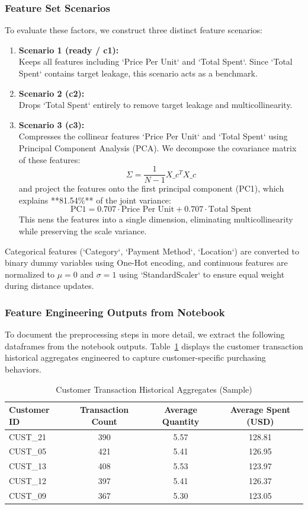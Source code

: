 \documentclass[12pt,a4paper]{article}
\begin{document}
\subsubsection{Feature Set Scenarios}
To evaluate these factors, we construct three distinct feature scenarios:
\begin{enumerate}
    \item \textbf{Scenario 1 (ready / c1):}\mbox{}\\ Keeps all features including `Price Per Unit` and `Total Spent`. Since `Total Spent` contains target leakage, this scenario acts as a benchmark.
    \item \textbf{Scenario 2 (c2):}\mbox{}\\ Drops `Total Spent` entirely to remove target leakage and multicollinearity.
    \item \textbf{Scenario 3 (c3):}\mbox{}\\ Compresses the collinear features `Price Per Unit` and `Total Spent` using Principal Component Analysis (PCA). We decompose the covariance matrix of these features:
        \[
        \Sigma = \frac{1}{N-1} X\_c^T X\_c
        \]
        and project the features onto the first principal component (PC1), which explains **81.54\%** of the joint variance:
        \[
        \text{PC1} = 0.707 \cdot \text{Price Per Unit} + 0.707 \cdot \text{Total Spent}
        \]
        This nens the features into a single dimension, eliminating multicollinearity while preserving the scale variance.
\end{enumerate}
Categorical features (`Category`, `Payment Method`, `Location`) are converted to binary dummy variables using One-Hot encoding, and continuous features are normalized to $\mu=0$ and $\sigma=1$ using `StandardScaler` to ensure equal weight during distance updates.

\subsubsection{Feature Engineering Outputs from Notebook}
To document the preprocessing steps in more detail, we extract the following dataframes from the notebook outputs. Table~\ref{tab:cust_agg} displays the customer transaction historical aggregates engineered to capture customer-specific purchasing behaviors.
\begin{table}[H]
\centering
\caption{Customer Transaction Historical Aggregates (Sample)}
\label{tab:cust_agg}
\begin{tabular}{lccc}
\toprule
\textbf{Customer ID} & \textbf{Transaction Count} & \textbf{Average Quantity} & \textbf{Average Spent (USD)} \\
\midrule
CUST\_21 & 390 & 5.57 & 128.81 \\
CUST\_05 & 421 & 5.41 & 126.95 \\
CUST\_13 & 408 & 5.53 & 123.97 \\
CUST\_12 & 397 & 5.41 & 126.37 \\
CUST\_09 & 367 & 5.30 & 123.05 \\
\bottomrule
\end{tabular}
\end{table}
\end{document}

